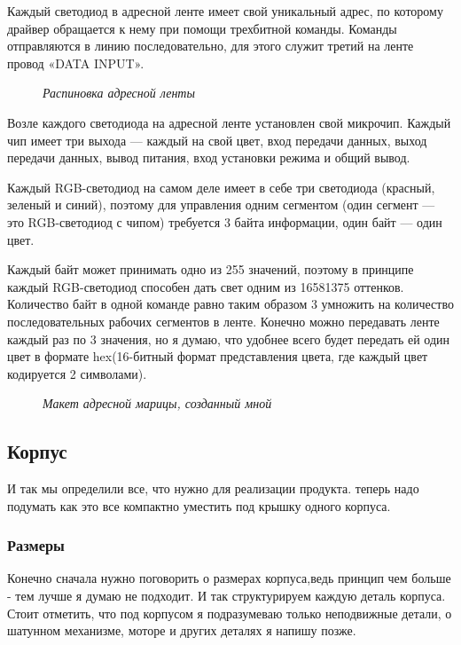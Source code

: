 \documentclass[a4paper, 12pt]{article}
\newcommand{\image}[3]{
	\begin{figure}[ht]
		\center{\texttt{[image: img/\#1]} }
		\caption{\textit{#3}}\end{figure}
}
\begin{document}
Каждый светодиод в адресной ленте имеет свой уникальный адрес, по которому
драйвер обращается к нему при помощи трехбитной команды. Команды отправляются в
линию последовательно, для этого служит третий на ленте провод «DATA INPUT».

\image{лента.jpg}{80}{Распиновка адресной ленты}

Возле каждого светодиода на адресной ленте установлен свой микрочип.
Каждый чип имеет три выхода — каждый на свой цвет, вход передачи данных,
выход передачи данных, вывод питания, вход установки режима и общий вывод.

Каждый RGB-светодиод на самом деле имеет в себе три светодиода (красный,
зеленый и синий), поэтому для управления одним сегментом (один сегмент — это
RGB-светодиод с чипом) требуется 3 байта информации, один байт — один цвет.

Каждый байт может принимать одно из 255 значений, поэтому в принципе каждый
RGB-светодиод способен дать свет одним из 16581375 оттенков. Количество байт
в одной команде равно таким образом 3 умножить на количество последовательных
рабочих сегментов в ленте. Конечно можно передавать ленте каждый раз по 3
значения, но я думаю, что удобнее всего будет передать ей один цвет в формате
hex(16-битный формат представления цвета, где каждый цвет кодируется 2
символами).


\image{лента в тинкеркад.png}{180}{Макет адресной марицы, созданный мной}

\newpage

\subsection{Корпус}
И так мы определили все, что нужно для реализации продукта.
теперь надо подумать как это все компактно уместить под крышку
одного корпуса.
\subsubsection{Размеры}
Конечно сначала нужно поговорить о размерах корпуса,ведь принцип
чем больше - тем лучше я думаю не подходит. И так структурируем каждую
деталь корпуса. Стоит отметить, что под корпусом я подразумеваю только
неподвижные детали, о шатунном механизме, моторе и других деталях я
напишу позже.
\end{document}
